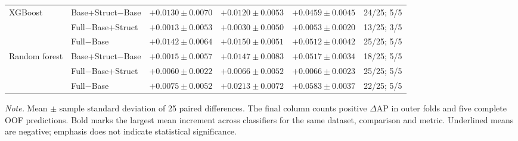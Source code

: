\begin{table}[htbp]
\begin{threeparttable}
\begin{tabular}{llcccc}
XGBoost & Base+Struct$-$Base & $+0.0130 \pm 0.0070$ & $+0.0120 \pm 0.0053$ & $+0.0459 \pm 0.0045$ & 24/25; 5/5 \\
 & Full$-$Base+Struct & $+0.0013 \pm 0.0053$ & $+0.0030 \pm 0.0050$ & $+0.0053 \pm 0.0020$ & 13/25; 3/5 \\
 & Full$-$Base & $+0.0142 \pm 0.0064$ & $+0.0150 \pm 0.0051$ & $+0.0512 \pm 0.0042$ & 25/25; 5/5 \\
\addlinespace
Random forest & Base+Struct$-$Base & $+0.0015 \pm 0.0057$ & $+0.0147 \pm 0.0083$ & $\mathbf{+0.0517} \pm 0.0034$ & 18/25; 5/5 \\
 & Full$-$Base+Struct & $\mathbf{+0.0060} \pm 0.0022$ & $\mathbf{+0.0066} \pm 0.0052$ & $\mathbf{+0.0066} \pm 0.0023$ & 25/25; 5/5 \\
 & Full$-$Base & $+0.0075 \pm 0.0052$ & $\mathbf{+0.0213} \pm 0.0072$ & $\mathbf{+0.0583} \pm 0.0037$ & 22/25; 5/5 \\
\bottomrule
\end{tabular}
\begin{tablenotes}[flushleft]
\footnotesize
\setlength{\labelsep}{0pt}\item[] \textit{Note.} Mean $\pm$ sample standard deviation of 25 paired differences. The final column counts positive $\Delta$AP in outer folds and five complete OOF predictions. Bold marks the largest mean increment across classifiers for the same dataset, comparison and metric. Underlined means are negative; emphasis does not indicate statistical significance.
\end{tablenotes}
\end{threeparttable}
\end{table}

